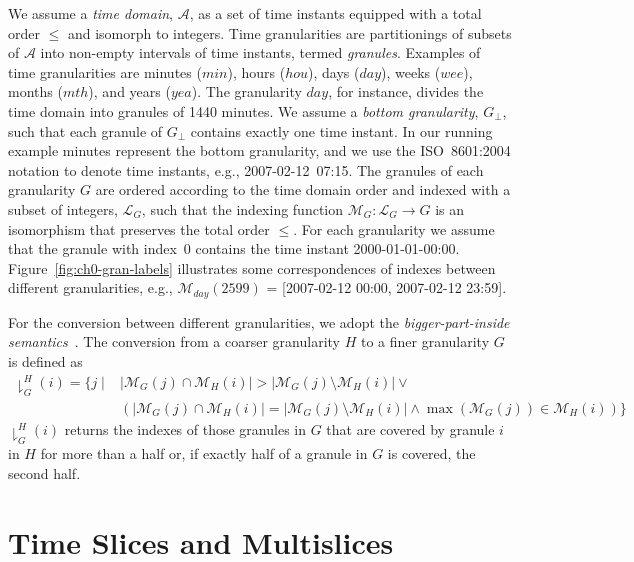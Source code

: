 \documentclass[abstracton,12pt]{scrreprt}
\begin{document}
We assume a \emph{time domain}, $\mathcal{A}$, as a set of time
instants equipped with a total order $\leq$ and isomorph to integers.
Time granularities are partitionings of subsets of $\mathcal{A}$ into
non-empty intervals of time instants, termed \emph{granules}.
Examples of time granularities are minutes ($\mathit{min}$), hours
($\mathit{hou}$), days ($\mathit{day}$), weeks ($\mathit{wee}$),
months ($\mathit{mth}$), and years ($\mathit{yea}$).  The granularity
$\mathit{day}$, for instance, divides the time domain into granules of
1440 minutes.  We assume a \emph{bottom granularity}, $G_\bot$, such
that each granule of $G_\bot$ contains exactly one time instant.  In
our running example minutes represent the bottom granularity, and we
use the ISO~8601:2004 notation to denote time instants, e.g.,
\mbox{2007-02-12 07:15}.  The granules of each granularity $G$ are
ordered according to the time domain order and indexed with a subset
of integers, $\mathcal{L}_G$, such that the indexing function
$\mathcal{M}_G : \mathcal{L}_G \to G$ is an isomorphism that preserves
the total order $\leq$. For each granularity we assume that the
granule with index~0 contains the time instant 2000-01-01-00:00.
Figure~\ref{fig:ch0-gran-labels} illustrates some correspondences of
indexes between different granularities, e.g.,
$\mathcal{M}_\mathit{day}(2599)$ = [2007-02-12 00:00, 2007-02-12
23:59].

For the conversion between different granularities, we adopt the
\emph{bigger-part-inside semantics}~\cite{Ohlbach06,ical98}.  The
conversion from a coarser granularity $H$ to a finer granularity $G$
is defined as
\begin{align*}
  \downharpoonright^{H}_{G}(i) = \{ j \mid
  & |\mathcal{M}_{G}(j) \cap
  \mathcal{M}_{H}(i)| > |\mathcal{M}_{G}(j) \setminus
  \mathcal{M}_{H}(i)| \lor {}
  \\
  & (|\mathcal{M}_{G}(j) \cap \mathcal{M}_{H}(i)| =
  |\mathcal{M}_{G}(j) \setminus \mathcal{M}_{H}(i)| \land
  \max(\mathcal{M}_{G}(j)) \in \mathcal{M}_{H}(i) )\}
\end{align*}
$\downharpoonright^{H}_{G}(i)$ returns the indexes of those granules
in $G$ that are covered by granule $i$ in $H$ for more than a half or,
if exactly half of a granule in $G$ is covered, the second half.

\section{Time Slices and Multislices}
\end{document}
